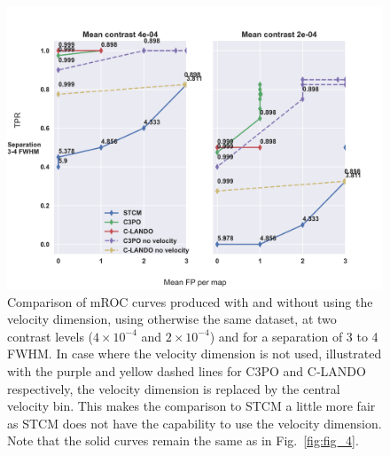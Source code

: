 \documentclass{aa}
\begin{document}
\begin{figure}
    \centering
    \includegraphics[width=\textwidth]{Fig6_final_September.png}
    \caption{Comparison of mROC curves produced with and without using the velocity dimension, using otherwise the same dataset, at two contrast levels ($4\times 10^{-4}$ and $2\times 10^{-4}$) and for a separation of 3 to 4 FWHM. In case where the velocity dimension is not used, illustrated with the purple and yellow dashed lines for C3PO and C-LANDO respectively, the velocity dimension is replaced by the central velocity bin. This makes the comparison to STCM a little more fair as STCM does not have the capability to use the velocity dimension.
    Note that the solid curves remain the same as in Fig.~\ref{fig:fig_4}.
    }
    \label{fig:novel_roc}
\end{figure}
\end{document}
